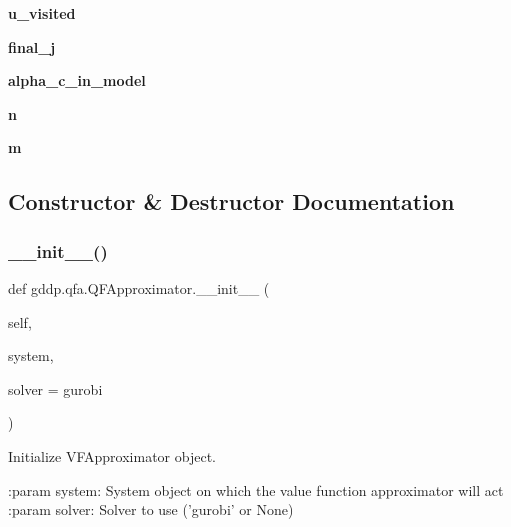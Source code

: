 \begin{DoxyCompactItemize}
{\bfseries u\+\_\+visited}
\item 
\mbox{\label{classgddp_1_1qfa_1_1_q_f_approximator_adefb75ab26485fb1ca51e5a00c28b60a}} 
{\bfseries final\+\_\+j}
\item 
\mbox{\label{classgddp_1_1qfa_1_1_q_f_approximator_ac1f818a6c31e5d3a3b24c19170f54a02}} 
{\bfseries alpha\+\_\+c\+\_\+in\+\_\+model}
\item 
\mbox{\label{classgddp_1_1qfa_1_1_q_f_approximator_a479b25a1a537dc1b7f2da86ecbda786c}} 
{\bfseries n}
\item 
\mbox{\label{classgddp_1_1qfa_1_1_q_f_approximator_adf06d03993b426d31414b93b6d65f0e4}} 
{\bfseries m}
\end{DoxyCompactItemize}


\subsection{Constructor \& Destructor Documentation}
\mbox{\label{classgddp_1_1qfa_1_1_q_f_approximator_a93a03d1246461e93c47cb88b8991cae8}} 
\subsubsection{\texorpdfstring{\_\_init\_\_()}{\_\_init\_\_()}}
{\footnotesize\ttfamily def gddp.\+qfa.\+Q\+F\+Approximator.\+\_\+\+\_\+init\+\_\+\+\_\+ (\begin{DoxyParamCaption}\item[{}]{self,  }\item[{}]{system,  }\item[{}]{solver = {\ttfamily \textquotesingle{}gurobi\textquotesingle{}} }\end{DoxyParamCaption})}

\begin{DoxyVerb}Initialize VFApproximator object.

:param system: System object on which the value function approximator will act
:param solver: Solver to use ('gurobi' or None)
\end{DoxyVerb}
 


